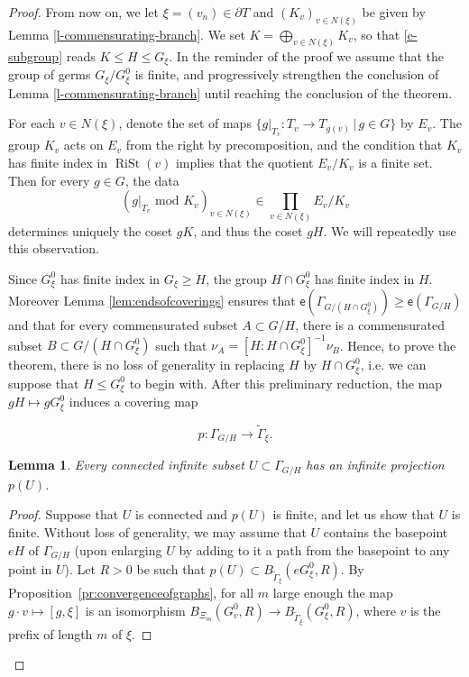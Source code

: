 \documentclass[11pt]{amsart}
\newcommand{\arr}{\longrightarrow}
\newcommand{\rist}{\ensuremath{\operatorname{RiSt}}}%
\newcommand{\Gammatilde}{\ensuremath{\widetilde{\Gamma}}}%
\newcommand{\esf}{\ensuremath{\mathsf{e}}}
\theoremstyle{definition}
\theoremstyle{plain}
\newtheorem{main thm}{Theorem}
\newtheorem{lemma}[defin]{Lemma}
\theoremstyle{remark}
\theoremstyle{plain}
\begin{document}
\begin{proof}
From now on, we let $\xi=(v_n)\in \partial T$ and $(K_v)_{v\in N(\xi)}$ be given by Lemma \ref{l-commensurating-branch}. We set $K=\bigoplus_{v\in N(\xi)} K_v$, so that \eqref{e-subgroup} reads $K\le H\le G_\xi$. In the reminder of the proof we assume that the group of germs $G_\xi /G^0_\xi$ is finite, and progressively strengthen the conclusion of Lemma \ref{l-commensurating-branch} until reaching the conclusion of the theorem. 


For each $v\in N(\xi)$, denote the set of maps $\{g|_{T_v}\colon T_v\to T_{g(v)} \,  \vert \, g\in G\}$ by $E_v$.
The group $K_v$ acts on $E_v$ from the right by precomposition, and the condition that $K_v$ has finite index in $\rist(v)$ implies that the quotient $E_v/K_v$ is a finite set. Then for every $g\in G$, the data 
\[(g|_{T_v}\text{ mod }K_v)_{v\in N(\xi)}
\in \prod_{v\in N(\xi)} E_v/K_v\]
determines uniquely the coset $g K$, and thus the coset $gH$. We will repeatedly use this observation. 
 
Since $G^0_\xi$ has finite index in $G_\xi\ge H$, the group $H\cap G^0_\xi$ has finite index in $H$. Moreover Lemma \ref{lem:endsofcoverings} ensures that $\esf(\Gamma_{G/(H\cap G^0_\xi)})\ge \esf(\Gamma_{G/H})$  and that for every commensurated subset $A\subset{G/H}$, there is a commensurated subset $B\subset {G/(H\cap G^0_\xi)}$  such that $\nu_A=[H\colon H\cap G^0_\xi]^{-1}\nu_B$.  Hence, to prove the theorem, there is no loss of generality in replacing $H$ by $H \cap G^0_\xi$, i.e. we can suppose that $H\le G^0_\xi$ to begin with. After this preliminary reduction,  the map $gH\mapsto gG^0_\xi$ induces a covering map 

\[p\colon \Gamma_{G/H}\to  \widetilde{\Gamma}_\xi.\]


\begin{lemma}\label{l-fiber-disconnected}
Every connected infinite subset $U\subset \Gamma_{G/H}$ has an infinite projection $p(U)$.
\end{lemma}
\begin{proof}
Suppose that $U$ is connected and $p(U)$ is finite, and let us show that $U$ is finite. Without loss of generality, we may assume that $U$ contains the basepoint $eH$ of $\Gamma_{G/H}$ (upon enlarging $U$ by adding to it a path from the basepoint to any point in $U$). Let $R>0$ be such that $p(U)\subset B_{\Gammatilde_\xi}(eG^0_\xi, R)$. By Proposition~\ref{pr:convergenceofgraphs}, for all $m$ large enough the map $g\cdot v\mapsto [g, \xi]$ is an isomorphism $B_{\Xi_m}(G^0_v, R)\arr B_{\Gammatilde_\xi}(G^0_\xi, R)$, where $v$ is the prefix of length $m$ of $\xi$.


\end{proof}
\end{proof}
\end{document}
